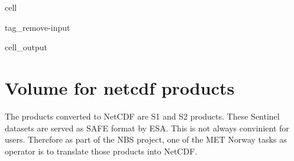 \documentclass[letterpaper,10pt,english]{jupyterBook}
\begin{document}
\begin{sphinxuseclass}{cell}
\begin{sphinxuseclass}{tag_remove-input}\begin{sphinxVerbatimOutput}

\begin{sphinxuseclass}{cell_output}
\noindent{}

\end{sphinxuseclass}\end{sphinxVerbatimOutput}

\end{sphinxuseclass}
\end{sphinxuseclass}

\section{Volume for netcdf products}
\label{\detokenize{volumes:volume-for-netcdf-products}}
\sphinxAtStartPar
The products converted to NetCDF are S1 and S2 products. These Sentinel datasets are served as SAFE format by ESA. This is not always convinient for users. Therefore as part of the NBS project, one of the MET Norway tasks as operator is to translate those products into NetCDF.
\end{document}
